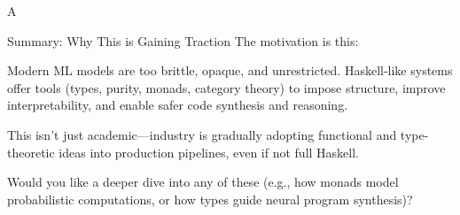 \documentclass[11pt, a4paper]{article}
\begin{document}
\begin{section}{A}
\begin{subsection}
Summary: Why This is Gaining Traction
The motivation is this:

Modern ML models are too brittle, opaque, and unrestricted. Haskell-like systems offer tools (types, purity, monads, category theory) to impose structure, improve interpretability, and enable safer code synthesis and reasoning.

This isn’t just academic—industry is gradually adopting functional and type-theoretic ideas into production pipelines, even if not full Haskell.

Would you like a deeper dive into any of these (e.g., how monads model probabilistic computations, or how types guide neural program synthesis)?

\end{subsection}
\end{section}




\end{document}

